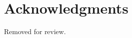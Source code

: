 \documentclass[conference]{IEEEtran}
\begin{document}




\section{Acknowledgments}
Removed for review.


 

 
\end{document}
